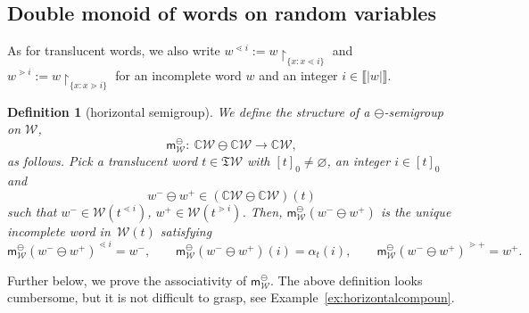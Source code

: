\documentclass[pdftex]{sigma}
\newcommand{\interval}[1]{\llbracket #1 \rrbracket}
\renewcommand{\restriction}[2]{{#1\mathbin{\upharpoonright}_{#2}}}
\newcommand{\stdl}{\lessdot}
\newcommand{\stdg}{\gtrdot}
\newcommand{\SWc}{{\mathfrak{T}\mathcal{W}}}
\newcommand\IWc{\mathcal{W}}
\newcommand\mS{\mathsf{m}^{\ominus}_{\IWc}}
\def\CC{\mathbb{C}}
\numberwithin{equation}{section}
\newtheorem{Definition}[Theorem]{Definition}
\begin{document}
\subsection{Double monoid of words on random variables}\label{sec:bimonoid}
As for translucent words, we also write $w^{\stdl i}:=\restriction{w}{\{x:x\stdl i\}}$ and $w^{\stdg i}:=\restriction{w}{\{x:x\stdg i\}}$ for an incomplete word $w$ and an integer $i\in\interval{|w|}$.
\begin{Definition}[horizontal semigroup]	\label{ominusproduct}
	We define the structure of a $\ominus$-semigroup on $\IWc$,
	\begin{equation*}
		\mS\colon \ \CC\IWc\ominus\CC\IWc \to \CC\IWc,
	\end{equation*}
	as follows. Pick a translucent word $t \in \SWc$ with $[t]_{0}\neq \varnothing$, an integer $i \in [t]_0$ and \[
	w^{-}\ominus w^{+} \in (\CC\IWc\ominus\CC\IWc) (t)
	\]
	such that
	$w^{-}\in\IWc(t^{\stdl i})$, $w^{+}\in\IWc(t^{\stdg i})$. Then, $\mS(w^{-}\ominus w^{+})$ is the unique incomplete word in~$\IWc(t)$ satisfying
	\[\mS(w^{-} \ominus w^{+})^{\stdl i}=w^{-},\qquad \mS(w^{-}\ominus w^{+})(i)=\alpha_t(i),\qquad \mS(w^{-}\ominus w^{+})^{\stdg +}=w^{+}. \]
\end{Definition}
Further below, we prove the associativity of $\mS$.
The above definition looks cumbersome, but it is not difficult to grasp, see Example~\ref{ex:horizontalcompoun}.
\end{document}
